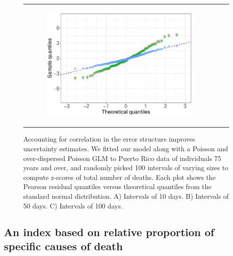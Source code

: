 \documentclass[11pt]{article}
\begin{document}
\begin{figure}[ht]
\begin{tabular}{lll}
\begin{subfigure}[t]{0.3\linewidth}
		\includegraphics[width=1\linewidth]{figs/figure-5c.pdf}
	\end{subfigure}\\
	\end{tabular}
	\caption{Accounting for correlation in the error structure improves uncertainty estimates. We fitted our model along with a Poisson and over-dispersed Poisson GLM to Puerto Rico data of individuals 75 years and over, and randomly picked 100 intervals of varying sizes to compute z-scores of total number of deaths. Each plot shows the Pearson residual quantiles versus theoretical quantiles from the standard normal distribution. A) Intervals of 10 days. B) Intervals of 50 days. C) Intervals of 100 days.}
	\label{fig:deaths-qqplots}
\end{figure}

\subsection{An index based on relative proportion of specific causes of death}
\label{subsec:causes-deaths}
\end{document}
